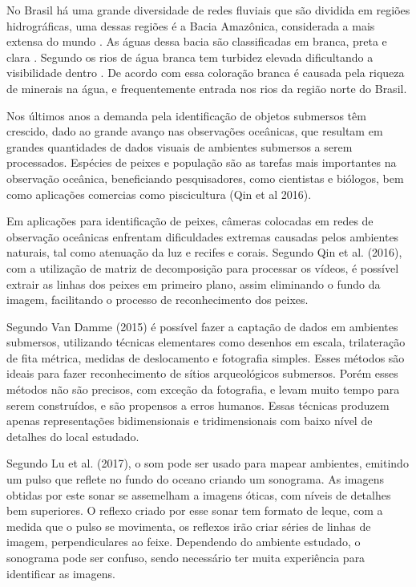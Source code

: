 No Brasil há uma grande diversidade de redes fluviais que são dividida em regiões hidrográficas, uma dessas regiões é a Bacia Amazônica, considerada a mais extensa do mundo \cite{portalbrasil:2009}. As águas dessa bacia são classificadas em branca, preta e clara \cite{sioli:2012}. Segundo  os rios de água branca tem turbidez elevada dificultando a visibilidade dentro \textcolor{da água}. De acordo com  essa coloração branca é causada pela riqueza de minerais na água, e frequentemente entrada nos rios da região norte do Brasil.

Nos últimos anos a demanda pela identificação de objetos submersos têm crescido, dado ao grande avanço nas observações oceânicas, que resultam em grandes quantidades de dados visuais de ambientes submersos a serem processados. Espécies de peixes e população são as tarefas mais importantes na observação oceânica, beneficiando pesquisadores, como cientistas e biólogos, bem como aplicações comercias como piscicultura (Qin et al 2016). 

Em aplicações para identificação de peixes, câmeras colocadas em redes de observação oceânicas enfrentam dificuldades extremas causadas pelos ambientes naturais, tal como atenuação da luz e recifes e corais. Segundo Qin et al. (2016), com a utilização de matriz de decomposição para processar os vídeos, é possível extrair as linhas dos peixes em primeiro plano, assim eliminando o fundo da imagem, facilitando o processo de reconhecimento dos peixes.

Segundo Van Damme (2015) é possível fazer a captação de dados em ambientes submersos, utilizando técnicas elementares como desenhos em escala, trilateração de fita métrica, medidas de deslocamento e fotografia simples. Esses métodos são ideais para fazer reconhecimento de sítios arqueológicos submersos. Porém esses métodos não são precisos, com exceção da fotografia, e levam muito tempo para serem construídos, e são propensos a erros humanos. Essas técnicas produzem apenas representações bidimensionais e tridimensionais com baixo nível de detalhes do local estudado.

Segundo  Lu et al. (2017), o som pode ser usado para mapear ambientes, emitindo um pulso que reflete no fundo do oceano criando um sonograma. As imagens obtidas por este sonar se assemelham a imagens óticas, com níveis de detalhes bem superiores. O reflexo criado por esse sonar tem formato de leque, com a medida que o pulso se movimenta, os reflexos irão criar séries de linhas de imagem, perpendiculares ao feixe. Dependendo do ambiente estudado, o sonograma pode ser confuso, sendo necessário ter muita experiência para identificar as imagens.


